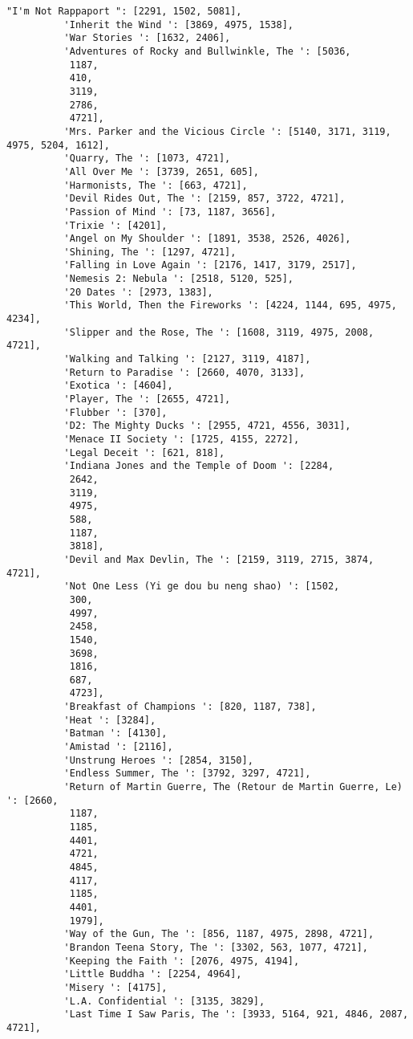 \documentclass[11pt]{article}
\begin{document}
\begin{Verbatim}[commandchars=\\\{\}]
          "I'm Not Rappaport ": [2291, 1502, 5081],
          'Inherit the Wind ': [3869, 4975, 1538],
          'War Stories ': [1632, 2406],
          'Adventures of Rocky and Bullwinkle, The ': [5036,
           1187,
           410,
           3119,
           2786,
           4721],
          'Mrs. Parker and the Vicious Circle ': [5140, 3171, 3119, 4975, 5204, 1612],
          'Quarry, The ': [1073, 4721],
          'All Over Me ': [3739, 2651, 605],
          'Harmonists, The ': [663, 4721],
          'Devil Rides Out, The ': [2159, 857, 3722, 4721],
          'Passion of Mind ': [73, 1187, 3656],
          'Trixie ': [4201],
          'Angel on My Shoulder ': [1891, 3538, 2526, 4026],
          'Shining, The ': [1297, 4721],
          'Falling in Love Again ': [2176, 1417, 3179, 2517],
          'Nemesis 2: Nebula ': [2518, 5120, 525],
          '20 Dates ': [2973, 1383],
          'This World, Then the Fireworks ': [4224, 1144, 695, 4975, 4234],
          'Slipper and the Rose, The ': [1608, 3119, 4975, 2008, 4721],
          'Walking and Talking ': [2127, 3119, 4187],
          'Return to Paradise ': [2660, 4070, 3133],
          'Exotica ': [4604],
          'Player, The ': [2655, 4721],
          'Flubber ': [370],
          'D2: The Mighty Ducks ': [2955, 4721, 4556, 3031],
          'Menace II Society ': [1725, 4155, 2272],
          'Legal Deceit ': [621, 818],
          'Indiana Jones and the Temple of Doom ': [2284,
           2642,
           3119,
           4975,
           588,
           1187,
           3818],
          'Devil and Max Devlin, The ': [2159, 3119, 2715, 3874, 4721],
          'Not One Less (Yi ge dou bu neng shao) ': [1502,
           300,
           4997,
           2458,
           1540,
           3698,
           1816,
           687,
           4723],
          'Breakfast of Champions ': [820, 1187, 738],
          'Heat ': [3284],
          'Batman ': [4130],
          'Amistad ': [2116],
          'Unstrung Heroes ': [2854, 3150],
          'Endless Summer, The ': [3792, 3297, 4721],
          'Return of Martin Guerre, The (Retour de Martin Guerre, Le) ': [2660,
           1187,
           1185,
           4401,
           4721,
           4845,
           4117,
           1185,
           4401,
           1979],
          'Way of the Gun, The ': [856, 1187, 4975, 2898, 4721],
          'Brandon Teena Story, The ': [3302, 563, 1077, 4721],
          'Keeping the Faith ': [2076, 4975, 4194],
          'Little Buddha ': [2254, 4964],
          'Misery ': [4175],
          'L.A. Confidential ': [3135, 3829],
          'Last Time I Saw Paris, The ': [3933, 5164, 921, 4846, 2087, 4721],

\end{Verbatim}
\end{document}

